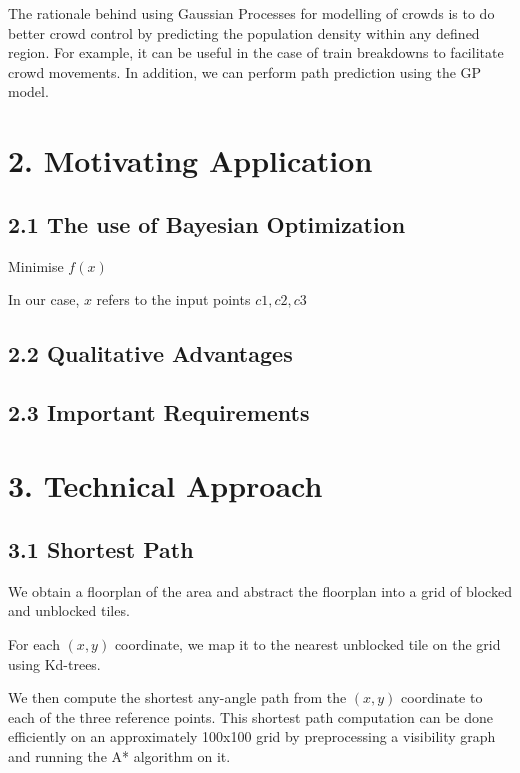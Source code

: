 \documentclass[letterpaper]{article}
\begin{document}
The rationale behind using Gaussian Processes for modelling of crowds is to do better crowd control by predicting the population density within any defined region. For example, it can be useful in the case of train breakdowns to facilitate crowd movements. In addition, we can perform path prediction using the GP model.

\section{2.  Motivating Application}



\subsection{2.1  The use of Bayesian Optimization}

Minimise $f(x)$

In our case, $x$ refers to the input points $c1, c2, c3$

\subsection{2.2  Qualitative Advantages}



\subsection{2.3  Important Requirements}



\section{3.  Technical Approach}



\subsection{3.1  Shortest Path}

We obtain a floorplan of the area and abstract the floorplan into a grid of blocked and unblocked tiles.

For each $(x,y)$ coordinate, we map it to the nearest unblocked tile on the grid using Kd-trees.

We then compute the shortest any-angle path from the $(x,y)$ coordinate to each of the three reference points. This shortest path computation can be done efficiently on an approximately 100x100 grid by preprocessing a visibility graph and running the A* algorithm on it.
\end{document}
